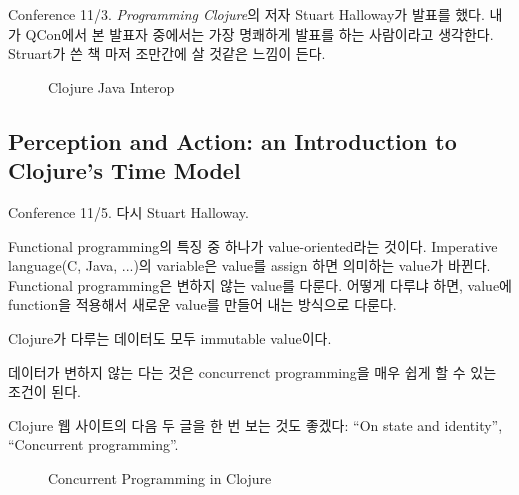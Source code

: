 \documentclass[11pt]{article}
\begin{document}
Conference 11/3.
\textit{Programming Clojure}\cite{halloway}의 저자 Stuart Halloway가 발표를 
했다. 내가 QCon에서 본 발표자 중에서는 가장 명쾌하게 발표를 하는 사람이라고 
생각한다. Struart가 쓴 책 마저 조만간에 살 것같은 느낌이 든다.
 
\begin{figure}[t]
    \begin{Frame}
        \begin{center}
        \end{center}
    \end{Frame}
    \caption{Clojure Java Interop}
    \label{clojure java}
\end{figure}

 
\subsection{Perception and Action: an Introduction to Clojure's Time Model}

Conference 11/5. 다시 Stuart Halloway.
 
 
Functional programming의 특징 중 하나가 value-oriented라는
것이다. Imperative language(C, Java, ...)의 variable은 value를 assign
하면 의미하는 value가 바뀐다. Functional programming은 변하지 않는
value를 다룬다. 어떻게 다루냐 하면, value에 function을 적용해서 새로운
value를 만들어 내는 방식으로 다룬다.
 
Clojure가 다루는 데이터도 모두  immutable value이다. 
 
데이터가 변하지 않는 다는 것은 concurrenct programming을 매우 쉽게 할
수 있는 조건이 된다.
 
Clojure 웹 사이트의 다음 두 글을 한 번 보는 것도 좋겠다:  ``On state and
identity'', ``Concurrent programming''.
 
\begin{figure}[t]
    \begin{Frame}
        \begin{center}
        \end{center}
    \end{Frame}
    \caption{Concurrent Programming in Clojure}
    \label{clojure concurrent}
\end{figure}
\end{document}
